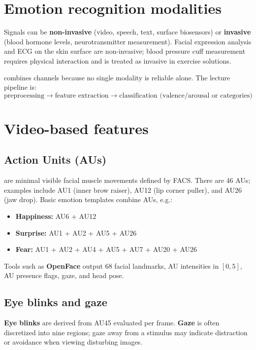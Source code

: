 \section{Emotion recognition modalities}

Signals can be \textbf{non-invasive} (video, speech, text, surface biosensors) or \textbf{invasive} (blood hormone levels, neurotransmitter measurement). Facial expression analysis and ECG on the skin surface are non-invasive; blood pressure cuff measurement requires physical interaction and is treated as invasive in exercise solutions.

 combines channels because no single modality is reliable alone. The lecture pipeline is:
\[
\text{preprocessing} \rightarrow \text{feature extraction} \rightarrow \text{classification (valence/arousal or categories)}
\]

\section{Video-based features}

\subsection{Action Units (AUs)}

 are minimal visible facial muscle movements defined by FACS. There are 46 AUs; examples include AU1 (inner brow raiser), AU12 (lip corner puller), and AU26 (jaw drop). Basic emotion templates combine AUs, e.g.:
\begin{itemize}
  \item \textbf{Happiness:} AU6 + AU12
  \item \textbf{Surprise:} AU1 + AU2 + AU5 + AU26
  \item \textbf{Fear:} AU1 + AU2 + AU4 + AU5 + AU7 + AU20 + AU26
\end{itemize}

Tools such as \textbf{OpenFace} output 68 facial landmarks, AU intensities in $[0,5]$, AU presence flags, gaze, and head pose.

\subsection{Eye blinks and gaze}

\textbf{Eye blinks} are derived from AU45 evaluated per frame. \textbf{Gaze} is often discretized into nine regions; gaze away from a stimulus may indicate distraction or avoidance when viewing disturbing images.

